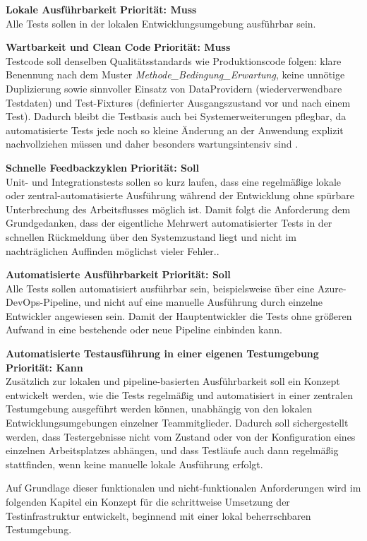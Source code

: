 \textbf{Lokale Ausführbarkeit} \hfill \textbf{Priorität: Muss}\\
Alle Tests sollen in der lokalen Entwicklungsumgebung ausführbar sein.

\textbf{Wartbarkeit und Clean Code} \hfill \textbf{Priorität: Muss}\\
Testcode soll denselben Qualitätsstandards wie Produktionscode folgen: klare Benennung nach dem Muster \textit{Methode\_Bedingung\_Erwartung}, keine unnötige Duplizierung sowie sinnvoller Einsatz von DataProvidern (wiederverwendbare Testdaten) und Test-Fixtures (definierter Ausgangszustand vor und nach einem Test). Dadurch bleibt die Testbasis auch bei Systemerweiterungen pflegbar, da automatisierte Tests jede noch so kleine Änderung an der Anwendung explizit nachvollziehen müssen und daher besonders wartungsintensiv sind \cite[S.~22]{Axelrod2018}.

\textbf{Schnelle Feedbackzyklen} \hfill \textbf{Priorität: Soll}\\
Unit- und Integrationstests sollen so kurz laufen, dass eine regelmäßige lokale oder zentral-automatisierte Ausführung während der Entwicklung ohne spürbare Unterbrechung des Arbeitsflusses möglich ist. Damit folgt die Anforderung dem Grundgedanken, dass der eigentliche Mehrwert automatisierter Tests in der schnellen Rückmeldung über den Systemzustand liegt und nicht im nachträglichen Auffinden möglichst vieler Fehler\cite[S.~22]{Axelrod2018}..

\textbf{Automatisierte Ausführbarkeit} \hfill \textbf{Priorität: Soll}\\
Alle Tests sollen automatisiert ausführbar sein, beispielsweise über eine Azure-DevOps-Pipeline, und nicht auf eine manuelle Ausführung durch einzelne Entwickler angewiesen sein. Damit der Hauptentwickler die Tests ohne größeren Aufwand in eine bestehende oder neue Pipeline einbinden kann.

\textbf{Automatisierte Testausführung in einer eigenen Testumgebung} \hfill \textbf{Priorität: Kann}\\
Zusätzlich zur lokalen und pipeline-basierten Ausführbarkeit soll ein Konzept entwickelt werden, wie die Tests regelmäßig und automatisiert in einer zentralen Testumgebung ausgeführt werden können, unabhängig von den lokalen Entwicklungsumgebungen einzelner Teammitglieder. Dadurch soll sichergestellt werden, dass Testergebnisse nicht vom Zustand oder von der Konfiguration eines einzelnen Arbeitsplatzes abhängen, und dass Testläufe auch dann regelmäßig stattfinden, wenn keine manuelle lokale Ausführung erfolgt.

Auf Grundlage dieser funktionalen und nicht-funktionalen Anforderungen wird im folgenden Kapitel ein Konzept für die schrittweise Umsetzung der Testinfrastruktur entwickelt, beginnend mit einer lokal beherrschbaren Testumgebung.